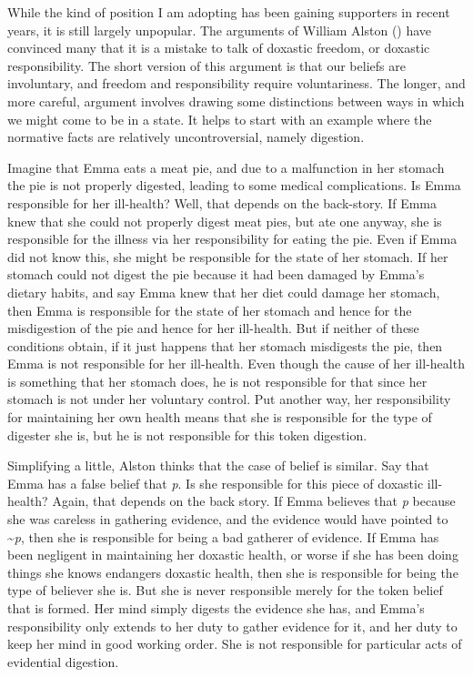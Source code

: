 \documentclass[
  11pt,
  letterpaper,
  DIV=11,
  numbers=noendperiod,
  twoside]{scrartcl}
\begin{document}
While the kind of position I am adopting has been gaining supporters in
recent years, it is still largely unpopular. The arguments of William
Alston () have convinced many that it is
a mistake to talk of doxastic freedom, or doxastic responsibility. The
short version of this argument is that our beliefs are involuntary, and
freedom and responsibility require voluntariness. The longer, and more
careful, argument involves drawing some distinctions between ways in
which we might come to be in a state. It helps to start with an example
where the normative facts are relatively uncontroversial, namely
digestion.

Imagine that Emma eats a meat pie, and due to a malfunction in her
stomach the pie is not properly digested, leading to some medical
complications. Is Emma responsible for her ill-health? Well, that
depends on the back-story. If Emma knew that she could not properly
digest meat pies, but ate one anyway, she is responsible for the illness
via her responsibility for eating the pie. Even if Emma did not know
this, she might be responsible for the state of her stomach. If her
stomach could not digest the pie because it had been damaged by Emma's
dietary habits, and say Emma knew that her diet could damage her
stomach, then Emma is responsible for the state of her stomach and hence
for the misdigestion of the pie and hence for her ill-health. But if
neither of these conditions obtain, if it just happens that her stomach
misdigests the pie, then Emma is not responsible for her ill-health.
Even though the cause of her ill-health is something that her stomach
does, he is not responsible for that since her stomach is not under her
voluntary control. Put another way, her responsibility for maintaining
her own health means that she is responsible for the type of digester
she is, but he is not responsible for this token digestion.

Simplifying a little, Alston thinks that the case of belief is similar.
Say that Emma has a false belief that \emph{p}. Is she responsible for
this piece of doxastic ill-health? Again, that depends on the back
story. If Emma believes that \emph{p} because she was careless in
gathering evidence, and the evidence would have pointed to
\textasciitilde{}\emph{p}, then she is responsible for being a bad
gatherer of evidence. If Emma has been negligent in maintaining her
doxastic health, or worse if she has been doing things she knows
endangers doxastic health, then she is responsible for being the type of
believer she is. But she is never responsible merely for the token
belief that is formed. Her mind simply digests the evidence she has, and
Emma's responsibility only extends to her duty to gather evidence for
it, and her duty to keep her mind in good working order. She is not
responsible for particular acts of evidential digestion.
\end{document}
